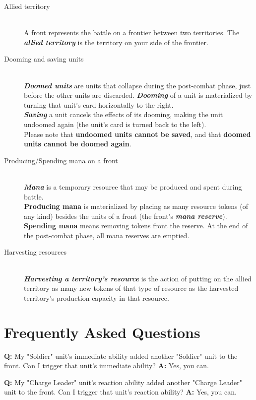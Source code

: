 \documentclass[a4paper]{article}
\begin{document}
    \begin{description}
        \item[Allied territory] \hfill \\
        A front represents the battle on a frontier between two territories.
        The \textbf{\textit{allied territory}} is the territory on
        your side of the frontier.
        \item[Dooming and saving units] \hfill \\
        \textbf{\textit{Doomed units}} are units that collapse during
        the post-combat phase, just before the other units are discarded.
        \textbf{\textit{Dooming}} of a unit is materialized by turning that
        unit's card horizontally to the right.\\
        \textbf{\textit{Saving}} a unit cancels the effects of its dooming,
        making the unit undoomed again (the unit's card is turned back to the left).\\
        Please note that \textbf{undoomed units cannot be saved},
        and that \textbf{doomed units cannot be doomed again}.
        \item[Producing/Spending mana on a front] \hfill \\
        \textbf{\textit{Mana}} is a temporary resource that may be produced
        and spent during battle.\\
        \textbf{Producing mana} is materialized by placing as many resource tokens
        (of any kind) besides the units of a front
        (the front's \textit{\textbf{mana reserve}}).\\
        \textbf{Spending mana} means removing tokens front the reserve.
        At the end of the post-combat phase, all mana reserves are emptied.
        \item[Harvesting resources] \hfill \\
        \textbf{\textit{Harvesting a territory's resource}} is the action of
        putting on the allied territory as many new tokens of that type of resource
        as the harvested territory's production capacity in that resource.
    \end{description}
    

\section{Frequently Asked Questions}

    \hspace{-2em}
    \textbf{Q:} My "Soldier" unit's immediate ability added another "Soldier"
    unit to the front. Can I trigger that unit's immediate ability?
    \newline
    \textbf{A:} Yes, you can.
    
    \hspace{-2em}
    \textbf{Q:} My "Charge Leader" unit's reaction ability added another
    "Charge Leader" unit to the front. Can I trigger that unit's reaction ability?
    \newline
    \textbf{A:} Yes, you can.
    
    
    
\end{document}
